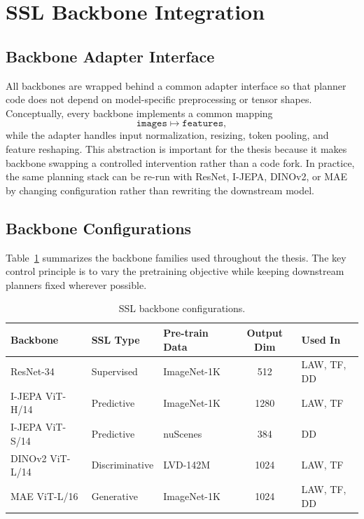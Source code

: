 \section{SSL Backbone Integration}
\label{sec:meth-backbones}

\subsection{Backbone Adapter Interface}
\label{sec:meth-backbone-adapter}

All backbones are wrapped behind a common adapter interface so that planner code does not depend on model-specific preprocessing or tensor shapes. Conceptually, every backbone implements a common mapping
\[
\texttt{images} \mapsto \texttt{features},
\]
while the adapter handles input normalization, resizing, token pooling, and feature reshaping. This abstraction is important for the thesis because it makes backbone swapping a controlled intervention rather than a code fork. In practice, the same planning stack can be re-run with ResNet, I-JEPA, DINOv2, or MAE by changing configuration rather than rewriting the downstream model.

\subsection{Backbone Configurations}
\label{sec:meth-backbone-configs}

Table~\ref{tab:backbones} summarizes the backbone families used throughout the thesis. The key control principle is to vary the pretraining objective while keeping downstream planners fixed wherever possible.

\begin{table}[ht]
\centering
\caption{SSL backbone configurations.}
\label{tab:backbones}
\begin{tabular}{lllcl}
\toprule
\textbf{Backbone} & \textbf{SSL Type} & \textbf{Pre-train Data} & \textbf{Output Dim} & \textbf{Used In} \\
\midrule
ResNet-34         & Supervised      & ImageNet-1K & 512  & LAW, TF, DD \\
I-JEPA ViT-H/14  & Predictive      & ImageNet-1K & 1280 & LAW, TF \\
I-JEPA ViT-S/14  & Predictive      & nuScenes    & 384  & DD \\
DINOv2 ViT-L/14  & Discriminative  & LVD-142M    & 1024 & LAW, TF \\
MAE ViT-L/16     & Generative      & ImageNet-1K & 1024 & LAW, TF, DD \\
\bottomrule
\end{tabular}
\end{table}

